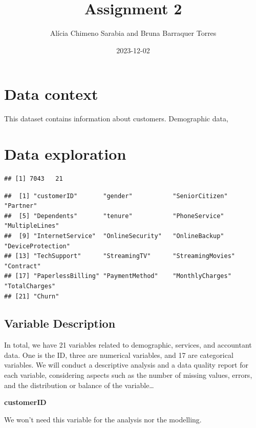\documentclass[
  twoside]{article}
\title{Assignment 2}
\author{Alícia Chimeno Sarabia and Bruna Barraquer Torres}
\date{2023-12-02}
\begin{document}
\maketitle

{
\setcounter{tocdepth}{2}
\tableofcontents
}
\newpage

\hypertarget{data-context}{%
\section{Data context}\label{data-context}}

This dataset contains information about customers. Demographic data,

\hypertarget{data-exploration}{%
\section{Data exploration}\label{data-exploration}}

\begin{verbatim}
## [1] 7043   21
\end{verbatim}

\begin{verbatim}
##  [1] "customerID"       "gender"           "SeniorCitizen"    "Partner"         
##  [5] "Dependents"       "tenure"           "PhoneService"     "MultipleLines"   
##  [9] "InternetService"  "OnlineSecurity"   "OnlineBackup"     "DeviceProtection"
## [13] "TechSupport"      "StreamingTV"      "StreamingMovies"  "Contract"        
## [17] "PaperlessBilling" "PaymentMethod"    "MonthlyCharges"   "TotalCharges"    
## [21] "Churn"
\end{verbatim}

\hypertarget{variable-description}{%
\subsection{Variable Description}\label{variable-description}}

In total, we have 21 variables related to demographic, services, and
accountant data. One is the ID, three are numerical variables, and 17
are categorical variables. We will conduct a descriptive analysis and a
data quality report for each variable, considering aspects such as the
number of missing values, errors, and the distribution or balance of the
variable\ldots{}

\textbf{customerID}

We won't need this variable for the analysis nor the modelling.
\end{document}
